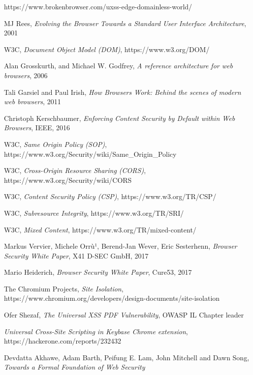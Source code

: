 \documentclass[journal]{IEEEtran}
\begin{document}
\begin{thebibliography}{1}

https://www.brokenbrowser.com/uxss-edge-domainless-world/

MJ Rees,
\textit{Evolving the Browser Towards a Standard User Interface Architecture}, 2001

W3C,
\textit{Document Object Model (DOM)},
https://www.w3.org/DOM/

Alan Grosskurth, and Michael W. Godfrey,
\textit{A reference architecture for web browsers}, 2006

Tali Garsiel and Paul Irish,
\textit{How Browsers Work: Behind the scenes of modern web browsers}, 2011

Christoph Kerschbaumer,
\textit{Enforcing Content Security by Default within Web Browsers}, IEEE, 2016

W3C,
\textit{Same Origin Policy (SOP)},
https://www.w3.org/Security/wiki/Same\_Origin\_Policy

W3C,
\textit{Cross-Origin Resource Sharing (CORS)},
https://www.w3.org/Security/wiki/CORS

W3C,
\textit{Content Security Policy (CSP)},
https://www.w3.org/TR/CSP/

W3C,
\textit{Subresource Integrity},
https://www.w3.org/TR/SRI/

W3C,
\textit{Mixed Content},
https://www.w3.org/TR/mixed-content/

Markus Vervier, Michele Orrù¹, Berend-Jan Wever, Eric Sesterhenn,
\textit{Browser Security White Paper},
X41 D-SEC GmbH, 2017


Mario Heiderich,
\textit{Browser Security White Paper},
Cure53, 2017

The Chromium Projects,
\textit{Site Isolation},
https://www.chromium.org/developers/design-documents/site-isolation

Ofer Shezaf,
\textit{The Universal XSS PDF Vulnerability},
OWASP IL Chapter leader

\textit{Universal Cross-Site Scripting in Keybase Chrome extension},
https://hackerone.com/reports/232432

Devdatta Akhawe, Adam Barth, Peifung E. Lam, John Mitchell and Dawn Song,
\textit{Towards a Formal Foundation of Web Security}


\end{thebibliography}
\end{document}
